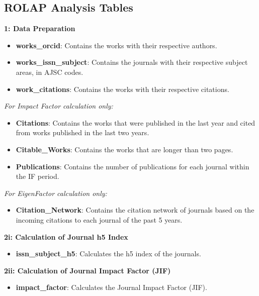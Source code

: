 \subsection{ROLAP Analysis Tables}

\noindent\textbf{1: Data Preparation}
\begin{itemize}
      \item \textbf{works\_orcid}: Contains the works with their respective authors.
      \item \textbf{works\_issn\_subject}: Contains the journals with their respective subject areas, in AJSC codes.
      \item \textbf{work\_citations}: Contains the works with their respective citations.
\end{itemize}

\vspace{0.5em} %
\noindent\emph{For Impact Factor calculation only:}
\begin{itemize}
      \item \textbf{Citations}: Contains the works that were published in the last year and cited from works published in the last two years.
      \item \textbf{Citable\_Works}: Contains the works that are longer than two pages.
      \item \textbf{Publications}: Contains the number of publications for each journal within the IF period.
\end{itemize}

\vspace{0.5em} %
\noindent\emph{For EigenFactor calculation only:}
\begin{itemize}
      \item \textbf{Citation\_Network}: Contains the citation network of journals based on the incoming citations to each journal of the past 5 years.
\end{itemize}

\noindent\textbf{2i: Calculation of Journal h5 Index}
\begin{itemize}
      \item \textbf{issn\_subject\_h5}: Calculates the h5 index of the journals.
\end{itemize}

\noindent\textbf{2ii: Calculation of Journal Impact Factor (JIF)}
\begin{itemize}
      \item \textbf{impact\_factor}: Calculates the Journal Impact Factor (JIF).
\end{itemize}

